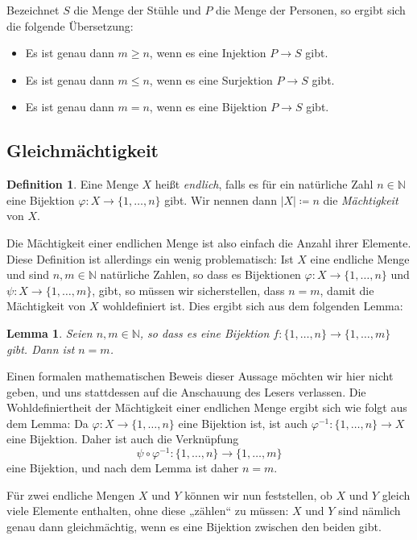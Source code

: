 \documentclass[a4paper,10pt]{article}
\newcounter{propositions}
\newtheorem{lem}[propositions]{Lemma}
\theoremstyle{definition}
\newtheorem*{defi}{Definition}
\newcommand{\N}{\mathbb{N}}
\begin{document}
Bezeichnet $S$ die Menge der Stühle und $P$ die Menge der Personen, so ergibt sich die folgende Übersetzung:
\begin{itemize}
 \item
  Es ist genau dann $m \geq n$, wenn es eine Injektion $P \to S$ gibt.
 \item
  Es ist genau dann $m \leq n$, wenn es eine Surjektion $P \to S$ gibt.
 \item
  Es ist genau dann $m = n$, wenn es eine Bijektion $P \to S$ gibt.
\end{itemize}



\subsection{Gleichmächtigkeit}

\begin{defi}
 Eine Menge $X$ heißt \emph{endlich}, falls es für ein natürliche Zahl $n \in \N$ eine Bijektion $\varphi \colon X \to \{1, \dotsc, n\}$ gibt. Wir nennen dann $|X| \coloneqq n$ die \emph{Mächtigkeit} von $X$.
\end{defi}

Die Mächtigkeit einer endlichen Menge ist also einfach die Anzahl ihrer Elemente. Diese Definition ist allerdings ein wenig problematisch: Ist $X$ eine endliche Menge und sind $n, m \in \N$ natürliche Zahlen, so dass es Bijektionen $\varphi \colon X \to \{1, \dotsc, n\}$ und $\psi \colon X \to \{1, \dotsc, m\}$, gibt, so müssen wir sicherstellen, dass $n = m$, damit die Mächtigkeit von $X$ wohldefiniert ist. Dies ergibt sich aus dem folgenden Lemma:

\begin{lem}
 Seien $n, m \in \N$, so dass es eine Bijektion $f \colon \{1, \dotsc, n\} \to \{1, \dotsc, m\}$ gibt. Dann ist $n = m$.
\end{lem}

Einen formalen mathematischen Beweis dieser Aussage möchten wir hier nicht geben, und uns stattdessen auf die Anschauung des Lesers verlassen. Die Wohldefiniertheit der Mächtigkeit einer endlichen Menge ergibt sich wie folgt aus dem Lemma: Da $\varphi \colon X \to \{1, \dotsc, n\}$ eine Bijektion ist, ist auch $\varphi^{-1} \colon \{1, \dotsc, n\} \to X$ eine Bijektion. Daher ist auch die Verknüpfung
\[
 \psi \circ \varphi^{-1} \colon \{1, \dotsc, n\} \to \{1, \dotsc, m\}
\]
eine Bijektion, und nach dem Lemma ist daher $n = m$.

Für zwei endliche Mengen $X$ und $Y$ können wir nun feststellen, ob $X$ und $Y$ gleich viele Elemente enthalten, ohne diese „zählen“ zu müssen: $X$ und $Y$ sind nämlich genau dann gleichmächtig, wenn es eine Bijektion zwischen den beiden gibt.
\end{document}
